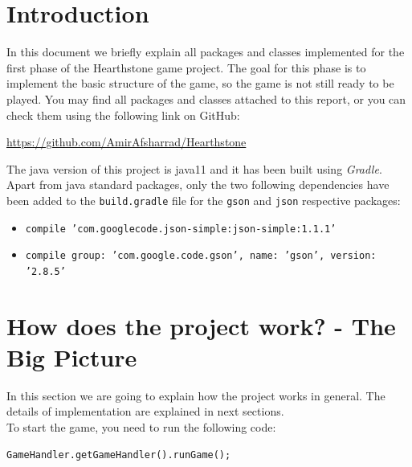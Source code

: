 \documentclass[a4paper]{article}
\begin{document}
\large
\tableofcontents
\clearpage
\section{Introduction}
In this document we briefly explain all packages and classes implemented for the first phase of the Hearthstone game project. The goal for this phase is to implement the basic structure of the game, so the game is not still ready to be played. You may find all packages and classes attached to this report, or you can check them using the following link on GitHub:
\begin{center}
	\url{https://github.com/AmirAfsharrad/Hearthstone}
\end{center}
The java version of this project is java11 and it has been built using \textit{Gradle}. Apart from java standard packages, only the two following dependencies have been added to the \texttt{build.gradle} file for the \texttt{gson} and \texttt{json} respective packages:
\begin{itemize}
	\item \texttt{compile 'com.googlecode.json-simple:json-simple:1.1.1'}
	\item \texttt{compile group: 'com.google.code.gson', name: 'gson', version: '2.8.5'}
\end{itemize}

\clearpage
\section{How does the project work? - The Big Picture}
In this section we are going to explain how the project works in general. The details of implementation are explained in next sections.\\

To start the game, you need to run the following code:
\begin{lstlisting}[style = javaStyle]
	GameHandler.getGameHandler().runGame();
\end{lstlisting}
\end{document}
